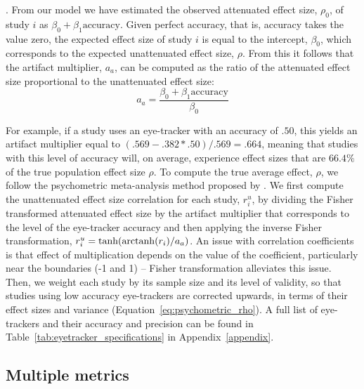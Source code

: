 \citep{hunter2004a}. From our model we have estimated the observed attenuated effect size, $\rho_0$, of study $i$ as $\beta_0 + \beta_1 \textrm{accuracy}$. Given perfect accuracy, that is, accuracy takes the value zero, the expected effect size of study $i$ is equal to the intercept, $\beta_0$, which corresponds to the expected unattenuated effect size, $\rho$. From this it follows that the artifact multiplier, $a_a$, can be computed as the ratio of the attenuated effect size proportional to the unattenuated effect size:
%
\begin{equation}
\label{eq:artifact_multiplier}
a_a = \frac{\beta_0 + \beta_1 \textrm{accuracy}}{\beta_0}
\end{equation}

For example, if a study uses an eye-tracker with an accuracy of $.50$, this yields an artifact multiplier equal to $(.569 - .382*.50)/.569 = .664$, meaning that studies with this level of accuracy will, on average, experience effect sizes that are $66.4\%$ of the true population effect size $\rho$. To compute the true average effect, $\rho$, we follow the psychometric meta-analysis method proposed by \cite{hunter2004a}. We first compute the unattenuated effect size correlation for each study, $r_i^u$, by dividing the Fisher transformed attenuated effect size by the artifact multiplier that corresponds to the level of the eye-tracker accuracy and then applying the inverse Fisher transformation, $r_i^u = \tanh(\operatorname{arctanh}(r_i)/a_a)$. An issue with correlation coefficients is that effect of multiplication depends on the value of the coefficient, particularly near the boundaries (-1 and 1) -- Fisher transformation alleviates this issue. Then, we weight each study by its sample size and its level of validity, so that studies using low accuracy eye-trackers are corrected upwards, in terms of their effect sizes and variance (Equation~\ref{eq:psychometric_rho}). A full list of eye-trackers and their accuracy and precision can be found in Table~\ref{tab:eyetracker_specifications} in Appendix~\ref{appendix}.


\subsection{Multiple metrics}

